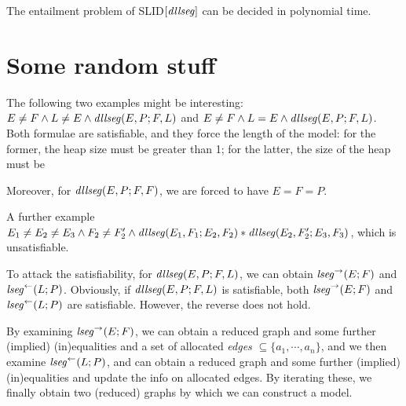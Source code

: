 \documentclass{llncs}
\begin{document}
\begin{theorem}
The entailment problem of SLID$[\mathit{dllseg}]$ can be decided in polynomial time.
\end{theorem}






\appendix

\section{Some random stuff}
\begin{example} \label{example:tl}
The following two examples might be interesting:
$E\neq F \wedge L\neq E \wedge \mathit{dllseg}(E, P ; F, L)$ and $E\neq F\wedge L= E  \wedge \mathit{dllseg}(E, P ; F, L)$. Both formulae are satisfiable, and they force the length of the model: for the former, the heap size must be greater than 1; for the latter, the size of the heap must be   

Moreover, for $\mathit{dllseg}(E, P; F, F)$, we are forced to have $E=F=P$. 

A further example $E_1\neq E_2\neq E_3\wedge F_2\neq F_2'\wedge \mathit{dllseg}(E_1, F_1; E_2, F_2)\ast \mathit{dllseg}(E_2, F'_2; E_3, F_3)$, which is unsatisfiable. 
\end{example}

To attack the satisfiability, for $\mathit{dllseg}(E, P; F, L)$, we can obtain $\mathit{lseg}^{\rightarrow}(E; F)$ and $\mathit{lseg}^{\leftarrow}(L; P)$. Obviously, if $\mathit{dllseg}(E, P; F, L)$ is satisfiable, both $\mathit{lseg}^{\rightarrow}(E; F)$ and $\mathit{lseg}^{\leftarrow}(L; P)$ are satisfiable. However, the reverse does not hold. 

By examining $\mathit{lseg}^{\rightarrow}(E; F)$, we can obtain a reduced graph and some further (implied) (in)equalities and a set of allocated \emph{edges} $\subseteq\{a_1, \cdots, a_n\}$, and we then examine $\mathit{lseg}^{\leftarrow}(L; P)$, and can obtain a reduced graph and some further (implied) (in)equalities and update the info on allocated edges. By iterating these, we finally obtain two (reduced) graphs by which we can construct a model. 
\end{document}

